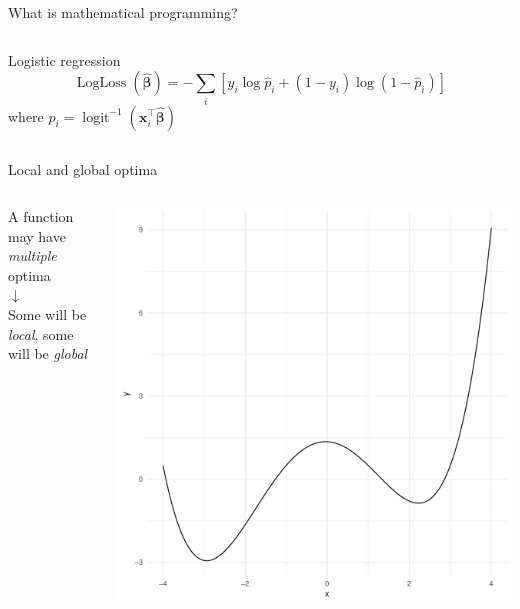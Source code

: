 \documentclass[16pt,aspectratio=169]{beamer}
\renewcommand{\vec}[1]{\ensuremath{\mathbf{#1}}}
\newcommand{\tr}{\ensuremath{\intercal}}
\begin{document}
\begin{frame}{What is mathematical programming?}
{\begin{columns}
            \begin{column}{0.65\textwidth}
                \begin{block}{\centering Logistic regression}
                    \centering
                    \[
                        \operatorname{LogLoss}(\hat{\vec{\beta}}) = - \sum_{i} \left[ y_{i} \log \hat{p}_{i} + (1 - y_{i}) \log (1 - \hat{p}_{i}) \right]
                    \]
                    where $\hat{p}_{i} = \operatorname{logit}^{-1}(\vec{x}_{i}^{\tr} \hat{\vec{\beta}})$
                \end{block}
            \end{column}
        \end{columns}}
\end{frame}

\begin{frame}{Local and global optima}
    \begin{columns}
        \begin{column}{0.5\textwidth}
            \centering
            A function may have \emph{multiple} optima \\[1em]
            $\downarrow$ \\[1em]
            Some will be \emph{local}, some will be \emph{global} \\[2em]
        \end{column}
        \begin{column}{0.5\textwidth}
            \includegraphics[height=0.95\textheight]{figures/local_vs_global_minima}
        \end{column}
    \end{columns}
\end{frame}
\end{document}

